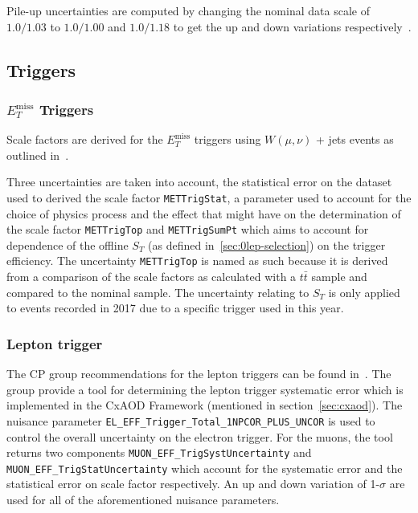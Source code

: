 Pile-up uncertainties are computed by changing the nominal data scale of
$1.0/1.03$ to $1.0/1.00$ and $1.0/1.18$ to get the up and down variations
respectively~\cite{puTWiki}.

\subsection{Triggers}
\label{sec:trigsys}

\subsubsection{\texorpdfstring{$E_T^{\text{miss}}$}{MET} Triggers}

Scale factors are derived for the $E_T^{\text{miss}}$ triggers using
$W(\mu,\nu)$ + jets events as outlined in~\cite{VHObjectNote2019}.

Three uncertainties are taken into account, the statistical error on the dataset
used to derived the scale factor \texttt{METTrigStat}, a parameter used to
account for the choice of physics process and the effect that might have on the
determination of the scale factor \texttt{METTrigTop} and \texttt{METTrigSumPt}
which aims to account for dependence of the offline $S_T$ (as defined
in~\ref{sec:0lep-selection}) on the trigger efficiency. The uncertainty
\texttt{METTrigTop} is named as such because it is derived from a comparison of
the scale factors as calculated with a $t\bar{t}$ sample and compared to the
nominal sample. The uncertainty relating to $S_T$ is only applied to events
recorded in 2017 due to a specific trigger used in this year.

\subsubsection{Lepton trigger}

The CP group recommendations for the lepton triggers can be found
in~\cite{VHObjectNote2019}. The group provide a tool for determining the lepton
trigger systematic error which is implemented in the CxAOD Framework (mentioned
in section~\ref{sec:cxaod}). The nuisance parameter
\texttt{EL\_EFF\_Trigger\_Total\_1NPCOR\_PLUS\_UNCOR} is used to control the overall
uncertainty on the electron trigger. For the muons, the tool returns two components
\texttt{MUON\_EFF\_TrigSystUncertainty} and \texttt{MUON\_EFF\_TrigStatUncertainty}
which account for the systematic error and the statistical error on scale factor
respectively. An up and down variation of 1-$\sigma$ are used for all of the
aforementioned nuisance parameters.


